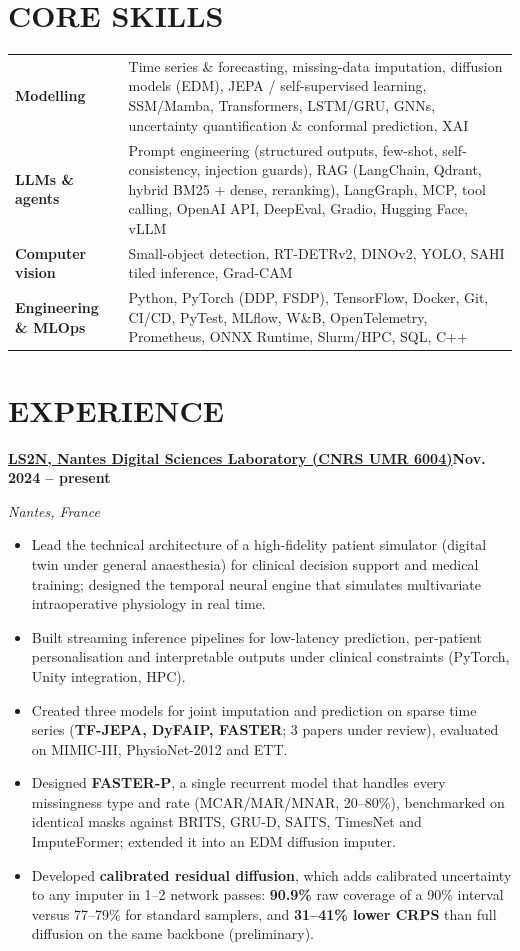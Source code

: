 \documentclass[10pt,a4paper]{article}
\newenvironment{cvitems}{\begin{itemize}[leftmargin=11pt,itemsep=0.5pt,topsep=1pt,parsep=0pt,label={\color{accent}\scriptsize$\blacktriangleright$}]\small}{\end{itemize}\vspace{2pt}}
\newcommand{\cvjob}[4]{%
  \noindent\textbf{#1}\hfill{\small\bfseries\textcolor{accent}{#2}}\par
  \noindent{\small\itshape\textcolor{muted}{#3}}\hfill{\small\itshape\textcolor{muted}{#4}}\par}
\newcommand{\cvskill}[2]{\textbf{#1} & #2\\[1.2pt]}
\begin{document}
\section{CORE SKILLS}
{\small
\begin{tabularx}{\linewidth}{@{}p{38mm}X@{}}
  \cvskill{Modelling}{Time series \& forecasting, missing-data imputation, diffusion models (EDM), JEPA / self-supervised learning, SSM/Mamba, Transformers, LSTM/GRU, GNNs, uncertainty quantification \& conformal prediction, XAI}
  \cvskill{LLMs \& agents}{Prompt engineering (structured outputs, few-shot, self-consistency, injection guards), RAG (LangChain, Qdrant, hybrid BM25 + dense, reranking), LangGraph, MCP, tool calling, OpenAI API, DeepEval, Gradio, Hugging Face, vLLM}
  \cvskill{Computer vision}{Small-object detection, RT-DETRv2, DINOv2, YOLO, SAHI tiled inference, Grad-CAM}
  \cvskill{Engineering \& MLOps}{Python, PyTorch (DDP, FSDP), TensorFlow, Docker, Git, CI/CD, PyTest, MLflow, W\&B, OpenTelemetry, Prometheus, ONNX Runtime, Slurm/HPC, SQL, C++}
\end{tabularx}}

\section{EXPERIENCE}
\cvjob{\href{https://www.ls2n.fr/}{LS2N, Nantes Digital Sciences Laboratory (CNRS UMR 6004)}}{Nov. 2024 – present}{Postdoctoral Researcher, AI for clinical time series and patient digital twins}{Nantes, France}
\begin{cvitems}
  \item Lead the technical architecture of a high-fidelity patient simulator (digital twin under general anaesthesia) for clinical decision support and medical training; designed the temporal neural engine that simulates multivariate intraoperative physiology in real time.
  \item Built streaming inference pipelines for low-latency prediction, per-patient personalisation and interpretable outputs under clinical constraints (PyTorch, Unity integration, HPC).
  \item Created three models for joint imputation and prediction on sparse time series (\textbf{TF-JEPA, DyFAIP, FASTER}; 3 papers under review), evaluated on MIMIC-III, PhysioNet-2012 and ETT.
  \item Designed \textbf{FASTER-P}, a single recurrent model that handles every missingness type and rate (MCAR/MAR/MNAR, 20–80\%), benchmarked on identical masks against BRITS, GRU-D, SAITS, TimesNet and ImputeFormer; extended it into an EDM diffusion imputer.
  \item Developed \textbf{calibrated residual diffusion}, which adds calibrated uncertainty to any imputer in 1–2 network passes: \textbf{90.9\%} raw coverage of a 90\% interval versus 77–79\% for standard samplers, and \textbf{31–41\% lower CRPS} than full diffusion on the same backbone (preliminary).
\end{cvitems}
\end{document}
